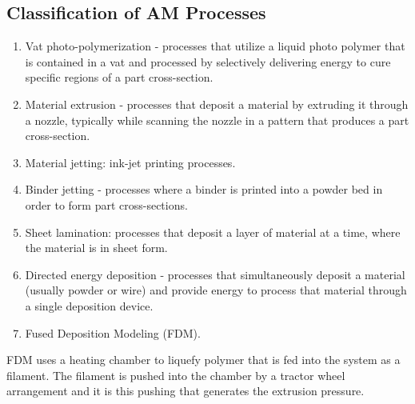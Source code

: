 \subsection{Classification of AM Processes}
\begin{enumerate}
\item Vat photo-polymerization - processes that utilize a liquid photo polymer that is
contained in a vat and processed by selectively delivering energy to cure specific
regions of a part cross-section.
\item Material extrusion - processes that deposit a material by extruding it through a
nozzle, typically while scanning the nozzle in a pattern that produces a part
cross-section.
\item Material jetting: ink-jet printing processes.
\item Binder jetting - processes where a binder is printed into a powder bed in order to
form part cross-sections.
\item Sheet lamination: processes that deposit a layer of material at a time, where the
material is in sheet form.
\item Directed energy deposition - processes that simultaneously deposit a material
(usually powder or wire) and provide energy to process that material through a
single deposition device.
\item Fused Deposition Modeling (FDM).
\end{enumerate}
FDM uses a
heating chamber to liquefy polymer that is fed into the system as a filament. The filament is pushed into the chamber by a tractor wheel arrangement and it is this
pushing that generates the extrusion pressure\cite{classnotes}.
